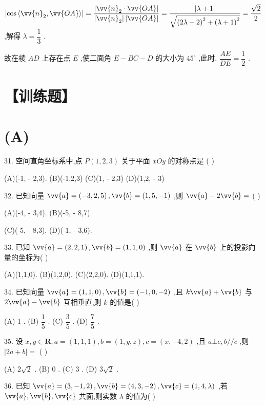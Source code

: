 $\left| {\cos \left\langle  {{\vv{n}}_{2},\vv{OA}}\right\rangle  }\right|  = \dfrac{\left| {\vv{n}}_{2} \cdot  \vv{OA}\right| }{\left| {\vv{n}}_{2}\right| \left| \vv{OA}\right| } = \dfrac{\left| \lambda  + 1\right| }{\sqrt{{\left( 2\lambda  - 2\right) }^{2} + {\left( \lambda  + 1\right) }^{2}}} = \dfrac{\sqrt{2}}{2}$ ,解得 $\lambda  = \dfrac{1}{3}$ .

故在棱 ${AD}$ 上存在点 $E$ ,使二面角 $E - {BC} - D$ 的大小为 ${45}^{ \circ  }$ ,此时, $\dfrac{AE}{DE} = \dfrac{1}{2}$ .

\section*{【训练题】}

\section*{(A)}

31. 空间直角坐标系中,点 $P\left( {1,2,3}\right)$ 关于平面 ${xOy}$ 的对称点是 (   )

(A)(-1, - 2,3). (B)(-1,2,3) (C)(1, - 2,3) (D)(1,2, - 3)

32. 已知向量 $\vv{a} = \left( {-3,2,5}\right) ,\vv{b} = \left( {1,5, - 1}\right)$ ,则 $\vv{a} - 2\vv{b} =$ (   )

(A)(-4, - 3,4). (B)(-5, - 8,7).

(C)(-5, - 8,3). (D)(-1, - 3,6).

33. 已知 $\vv{a} = \left( {2,2,1}\right) ,\vv{b} = \left( {1,1,0}\right)$ ,则 $\vv{a}$ 在 $\vv{b}$ 上的投影向量的坐标为(   )

(A)(1,1,0). (B)(1,2,0). (C)(2,2,0). (D)(1,1,1).

34. 已知向量 $\vv{a} = \left( {1,1,0}\right) ,\vv{b} = \left( {-1,0, - 2}\right)$ ,且 $k\vv{a} + \vv{b}$ 与 $2\vv{a} - \vv{b}$ 互相垂直,则 $k$ 的值是(   )

(A) 1 . (B) $\dfrac{1}{5}$ . (C) $\dfrac{3}{5}$ . (D) $\dfrac{7}{5}$ .

35. 设 $x,y \in  \mathbf{R},a = \left( {1,1,1}\right) ,b = \left( {1,y,z}\right) ,c = \left( {x, - 4,2}\right)$ ,且 $a \bot  c,b//c$ ,则 $\left| {{2a} + b}\right|  =$ (   )

(A) $2\sqrt{2}$ . (B) 0 . (C) 3 . (D) $3\sqrt{2}$ .

36. 已知 $\vv{a} = \left( {3, - 1,2}\right) ,\vv{b} = \left( {4,3, - 2}\right) ,\vv{c} = \left( {1,4,\lambda }\right)$ ,若 $\vv{a},\vv{b},\vv{c}$ 共面,则实数 $\lambda$ 的值为(   )

